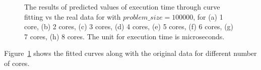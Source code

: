 \begin{figure}[H]
{	\label{fig43:h}}\hfill
	\caption{The results of predicted values of execution time through curve fitting vs the real data for with $problem\_size=100000$, for (a) 1 core, (b) 2 cores, (c) 3 cores, (d) 4 cores, (e) 5 cores, (f) 6 cores, (g) 7 cores, (h) 8 cores. The unit for execution time is microseconds.}
	\label{fig43}	
\end{figure}

Figure~\ref{fig43} shows the fitted curves along with the original data for different number of cores.


\begin{figure}[H]
	\centering
	\hfill
\end{figure}
